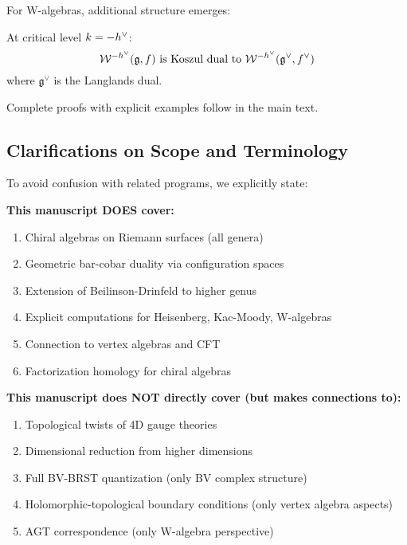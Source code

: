 For W-algebras, additional structure emerges:

\begin{theorem}
At critical level $k = -h^\vee$:
$$\mathcal{W}^{-h^\vee}(\mathfrak{g}, f) \text{ is Koszul dual to } \mathcal{W}^{-h^\vee}(\mathfrak{g}^\vee, f^\vee)$$
where $\mathfrak{g}^\vee$ is the Langlands dual.
\end{theorem}

Complete proofs with explicit examples follow in the main text.

\subsection{Clarifications on Scope and Terminology}
\label{subsec:scope-terminology}

\begin{remark}\label{rem:scope-explicit}
To avoid confusion with related programs, we explicitly state:

\textbf{This manuscript DOES cover:}
\begin{enumerate}
\item Chiral algebras on Riemann surfaces (all genera)
\item Geometric bar-cobar duality via configuration spaces
\item Extension of Beilinson-Drinfeld to higher genus
\item Explicit computations for Heisenberg, Kac-Moody, W-algebras
\item Connection to vertex algebras and CFT
\item Factorization homology for chiral algebras
\end{enumerate}

\textbf{This manuscript does NOT directly cover (but makes connections to):}
\begin{enumerate}
\item Topological twists of 4D gauge theories
\item Dimensional reduction from higher dimensions
\item Full BV-BRST quantization (only BV complex structure)
\item Holomorphic-topological boundary conditions (only vertex algebra aspects)
\item AGT correspondence (only W-algebra perspective)
\end{enumerate}
\end{remark}


